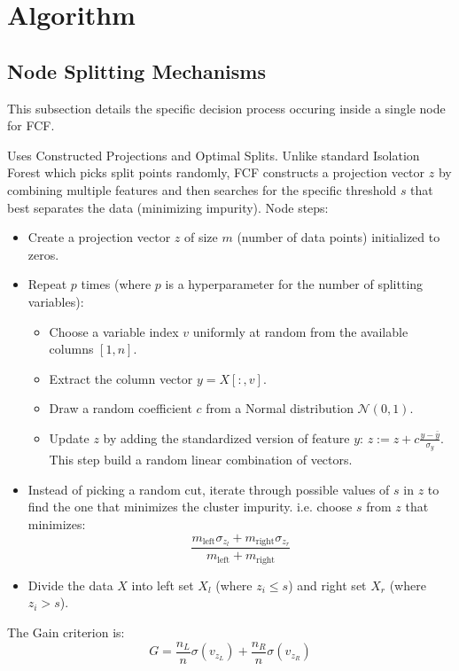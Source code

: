 \section{Algorithm}

\subsection{Node Splitting Mechanisms}
This subsection details the specific decision process occuring inside a single node for FCF.

Uses Constructed Projections and Optimal Splits. Unlike standard Isolation Forest which picks split points randomly, FCF constructs a projection vector $z$ by combining multiple features and then searches for the specific threshold $s$ that best separates the data (minimizing impurity).
Node steps:
\begin{itemize}
    \item Create a projection vector $z$ of size $m$ (number of data points) initialized to zeros.
    \item Repeat $p$ times (where $p$ is a hyperparameter for the number of splitting variables):
    \begin{itemize}
        \item Choose a variable index $v$ uniformly at random from the available columns $[1, n]$.
        \item Extract the column vector $y = X[:, v]$.
        \item Draw a random coefficient $c$ from a Normal distribution $\mathcal{N}(0,1)$.
        \item Update $z$ by adding the standardized version of feature $y$: $z := z + c \frac{y - \bar{y}}{\sigma_{y}}$. This step build a random linear combination of vectors.
    \end{itemize}
    \item Instead of picking a random cut, iterate through possible values of $s$ in $z$ to find the one that minimizes the cluster impurity. i.e. choose $s$ from $z$ that minimizes: $$\frac{m_{\text{left}} \sigma_{z_l} + m_{\text{right}} \sigma_{z_r}}{m_{\text{left}} + m_{\text{right}}}$$
    \item Divide the data $X$ into left set $X_l$ (where $z_i \le s$) and right set $X_r$ (where $z_i > s$).
\end{itemize}

The Gain criterion is: $$G =\frac{n_L}{n} \sigma(v_{z_L}) + \frac{n_R}{n} \sigma(v_{z_R})$$

